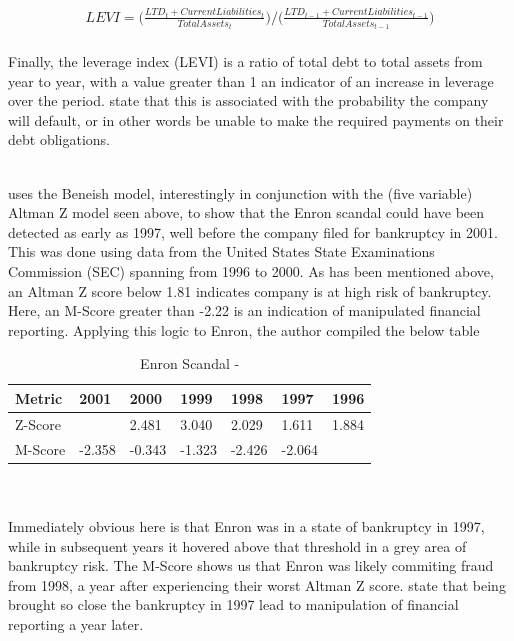 {\begin{equation}\label{MScore-LEVI}
\begin{aligned}
LEVI = \bigg(\frac{LTD_t + Current Liabilities_t }{Total Assets_t} \bigg) /  \bigg(\frac{LTD_{t-1} + Current Liabilities_{t-1} }{Total Assets_{t-1}} \bigg)
\end{aligned}
\end{equation}\\
Finally, the leverage index (LEVI) is a ratio of total debt to total assets from year to year, with a value greater than 1 an indicator of an increase in leverage over the period. \cite{beneishOG} state that this is associated with the probability the company will default, or in other words be unable to make the required payments on their debt obligations. }\\\\
{\cite{mahamaCorpFraud} uses the Beneish model, interestingly in conjunction with the (five variable) Altman Z model seen above, to show that the Enron scandal could have been detected as early as 1997, well before the company filed for bankruptcy in 2001. This was done using data from the United States State Examinations Commission (SEC) spanning from 1996 to 2000. As has been mentioned above, an Altman Z score below 1.81 indicates company is at high risk of bankruptcy. Here, an M-Score greater than -2.22 is an indication of manipulated financial reporting. Applying this logic to Enron, the author compiled the below table
\begin{table}[h!]
\centering
\begin{tabular}{ |p{2cm}||p{1.2cm}|p{1.2cm}|p{1.2cm}|p{1.2cm}|p{1.2cm}|p{1.2cm}|  }
 \hline
 Metric & 2001 & 2000 & 1999 & 1998 & 1997 & 1996\\
 \hline
 Z-Score &  & 2.481  & 3.040 & 2.029 & 1.611 & 1.884  \\
 M-Score & -2.358  & -0.343 & -1.323 & -2.426 & -2.064 &  \\
 \hline
\end{tabular}
\caption{Enron Scandal - \cite{mahamaCorpFraud}}
\end{table}\\\\
Immediately obvious here is that Enron was in a state of bankruptcy in 1997, while in subsequent years it hovered above that threshold in a grey area of bankruptcy risk. The M-Score shows us that Enron was likely commiting fraud from 1998, a year after experiencing their worst Altman Z score. \cite{mahamaCorpFraud} state that being brought so close the bankruptcy in 1997 lead to manipulation of financial reporting a year later.}\\\\
